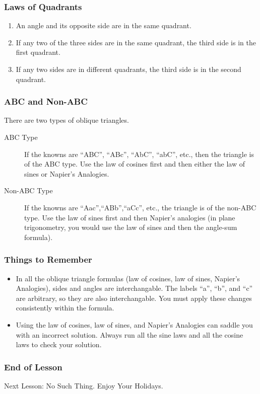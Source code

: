 \documentclass[xcolor=dvipsnames]{beamer}
\begin{document}
\begin{frame}
  \frametitle{Laws of Quadrants}
  \begin{enumerate}
  \item An angle and its opposite side are in the same quadrant.
  \item If any two of the three sides are in the same quadrant, the
    third side is in the first quadrant.
  \item If any two sides are in different quadrants, the third side is
    in the second quadrant.
  \end{enumerate}
\end{frame}

\begin{frame}
  \frametitle{ABC and Non-ABC}
  There are two types of oblique triangles.
  \begin{description}
  \item[ABC Type] If the knowns are ``ABC'', ``ABc'', ``AbC'', ``abC'', etc.,
    then the triangle is of the ABC type. Use the law of cosines first
    and then either the law of sines or Napier's Analogies.
  \item[Non-ABC Type] If the knowns are ``Aac'',``ABb'',``aCc'', etc., the
    triangle is of the non-ABC type. Use the law of sines first and
    then Napier's analogies (in plane trigonometry, you would use the
    law of sines and then the angle-sum formula).
  \end{description}
\end{frame}

\begin{frame}
  \frametitle{Things to Remember}
  \begin{itemize}
  \item In all the oblique triangle formulas (law of cosines, law of
    sines, Napier's Analogies), sides and angles are interchangable.
    The labels ``a'', ``b'', and ``c'' are arbitrary, so they are also
    interchangable. You must apply these changes consistently within
    the formula.
  \item Using the law of cosines, law of sines, and Napier's Analogies
    can saddle you with an incorrect solution. Always run all the sine
    laws and all the cosine laws to check your solution.
  \end{itemize}
\end{frame}

\begin{frame}
  \frametitle{End of Lesson}
Next Lesson: No Such Thing. Enjoy Your Holidays.
\end{frame}
\end{document}
